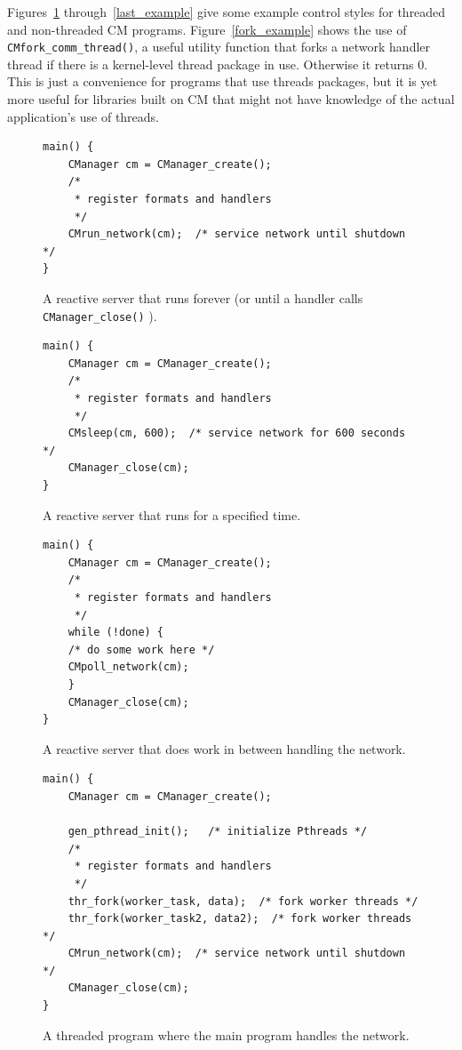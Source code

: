 \documentclass[11pt]{article}
\begin{document}
Figures~\ref{first_example} through~\ref{last_example} give some example
control styles for threaded and non-threaded CM programs.
Figure~\ref{fork_example} shows the use of {\tt CMfork\_comm\_thread()}, a
useful utility function that forks a network handler thread if there is a
kernel-level thread package in use.  Otherwise it returns 0.  This is just a
convenience for programs that use threads packages, but it is yet more
useful for libraries built on CM that might not have knowledge of the actual
application's use of threads.
\begin{figure}[p]
\center\begin{BVerbatim}
main() {
    CManager cm = CManager_create();
    /* 
     * register formats and handlers
     */
    CMrun_network(cm);  /* service network until shutdown */
}
\end{BVerbatim}
\caption{A reactive server that runs forever (or until a handler calls {\tt
CManager\_close()} ).\label{first_example}}
\end{figure}
\begin{figure}
\center\begin{BVerbatim}
main() {
    CManager cm = CManager_create();
    /*
     * register formats and handlers
     */
    CMsleep(cm, 600);  /* service network for 600 seconds */
    CManager_close(cm);
}
\end{BVerbatim}
\caption{A reactive server that runs for a specified time.}
\end{figure}
\begin{figure}
\center\begin{BVerbatim}
main() {
    CManager cm = CManager_create();
    /*
     * register formats and handlers
     */
    while (!done) {
	/* do some work here */
	CMpoll_network(cm);
    }
    CManager_close(cm);
}
\end{BVerbatim}
\caption{A reactive server that does work in between handling the network.}
\end{figure}
\begin{figure}
\center\begin{BVerbatim}
main() {
    CManager cm = CManager_create();

    gen_pthread_init();   /* initialize Pthreads */
    /*
     * register formats and handlers
     */
    thr_fork(worker_task, data);  /* fork worker threads */
    thr_fork(worker_task2, data2);  /* fork worker threads */
    CMrun_network(cm);  /* service network until shutdown */
    CManager_close(cm);
}
\end{BVerbatim}
\caption{A threaded program where the main program handles the network.}
\end{figure}
\end{document}

